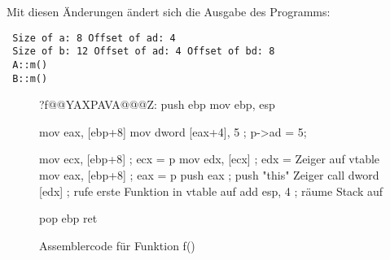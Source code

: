 \pagebreak
Mit diesen \"{A}nderungen \"{a}ndert sich die Ausgabe des Programms:
\begin{verbatim}
 Size of a: 8 Offset of ad: 4
 Size of b: 12 Offset of ad: 4 Offset of bd: 8
 A::m()
 B::m()
\end{verbatim}


\begin{figure}[tp]
\begin{AsmCodeListing}[numbers=left, commentchar=!, commandchars=\\\{\}]
 ?f@@YAXPAVA@@@Z:
     push   ebp
     mov    ebp, esp

     mov    eax, [ebp+8]
     mov    dword [eax+4], 5  ; p->ad = 5;

     mov    ecx, [ebp+8]      ; ecx = p                             \label{line:FAsm20}
     mov    edx, [ecx]        ; edx = Zeiger auf vtable             \label{line:FAsm21}
     mov    eax, [ebp+8]      ; eax = p                             \label{line:FAsm22}
     push   eax               ; push "this" Zeiger                  \label{line:FAsm23}
     call   dword [edx]       ; rufe erste Funktion in vtable auf   \label{line:FAsm24}
     add    esp, 4            ; r\"{a}ume Stack auf

     pop    ebp
     ret
\end{AsmCodeListing}
\caption{Assemblercode f\"{u}r Funktion {\code f()} \label{fig:FAsm2}}
\end{figure}

